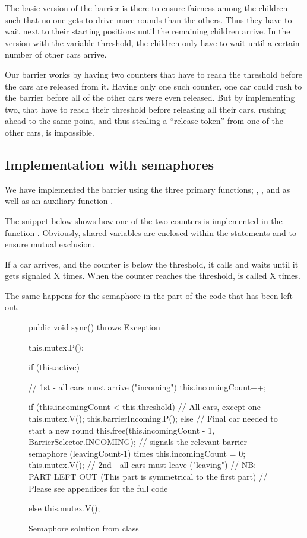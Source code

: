 
The basic version of the barrier is there to ensure fairness among the
children such that no one gets to drive more rounds than the
others. Thus they have to wait next to their starting positions until
the remaining children arrive. In the version with the variable
threshold, the children only have to wait until a certain number of
other cars arrive.

Our barrier works by having two counters that have to reach the
threshold before the cars are released from it. Having only one such
counter, one car could rush to the barrier before all of the other
cars were even released. But by implementing two, that have to reach
their threshold before releasing all their cars, rushing ahead to the
same point, and thus stealing a ``release-token'' from one of the
other cars, is impossible.


\subsection{Implementation with semaphores}
\label{sub:bar-sema}
We have implemented the barrier using the three primary functions;
, , and  as well as an auxiliary
function .

The snippet below shows how one of the two counters is implemented in
the function . Obviously, shared variables are enclosed
within the statements  and  to ensure
mutual exclusion.

If a car arrives, and the counter is below the threshold, it calls
 and waits until it gets signaled X
times. When the counter reaches the threshold,
 is called X times.

The same happens for the semaphore  in the part
of the code that has been left out.

\begin{figure}[H]
\begin{java}
public void sync() throws Exception {
	this.mutex.P();

	if (this.active) {
		// 1st - all cars must arrive ("incoming")
		this.incomingCount++;

		if (this.incomingCount < this.threshold) { // All cars, except one
			this.mutex.V();
			this.barrierIncoming.P();
		} else { // Final car needed to start a new round
			this.free(this.incomingCount - 1, BarrierSelector.INCOMING);
			// signals the relevant barrier-semaphore (leavingCount-1) times
			this.incomingCount = 0;
			this.mutex.V();
		}
		// 2nd - all cars must leave ("leaving")
		// NB: PART LEFT OUT (This part is symmetrical to the first part)
		// Please see appendices for the full code
	} else {
		this.mutex.V();
	}
}
\end{java}
\caption{Semaphore solution from  class}
\label{lst:bar-sema}
\end{figure}


